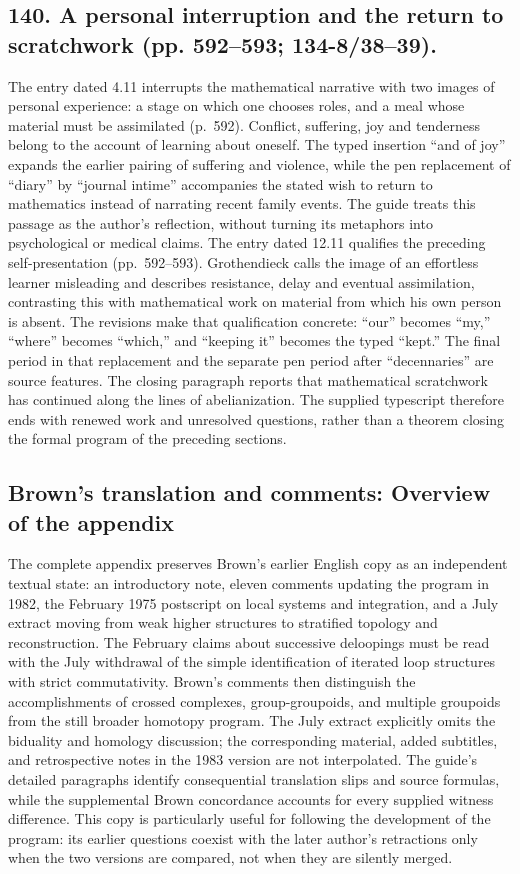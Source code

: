 \documentclass[10pt,oneside]{book}
\begin{document}
\subsection*{140. A personal interruption and the return to scratchwork (pp. 592--593; 134-8/38--39).}
The entry dated 4.11 interrupts the mathematical narrative with two images of personal experience: a stage on which one chooses roles, and a meal whose material must be assimilated (p.~592). Conflict, suffering, joy and tenderness belong to the account of learning about oneself. The typed insertion ``and of joy'' expands the earlier pairing of suffering and violence, while the pen replacement of ``diary'' by ``journal intime'' accompanies the stated wish to return to mathematics instead of narrating recent family events. The guide treats this passage as the author's reflection, without turning its metaphors into psychological or medical claims. The entry dated 12.11 qualifies the preceding self-presentation (pp.~592--593). Grothendieck calls the image of an effortless learner misleading and describes resistance, delay and eventual assimilation, contrasting this with mathematical work on material from which his own person is absent. The revisions make that qualification concrete: ``our'' becomes ``my,'' ``where'' becomes ``which,'' and ``keeping it'' becomes the typed ``kept.'' The final period in that replacement and the separate pen period after ``decennaries'' are source features. The closing paragraph reports that mathematical scratchwork has continued along the lines of abelianization. The supplied typescript therefore ends with renewed work and unresolved questions, rather than a theorem closing the formal program of the preceding sections.

\subsection*{Brown's translation and comments: Overview of the appendix}
The complete appendix preserves Brown's earlier English copy as an independent textual state: an introductory note, eleven comments updating the program in 1982, the February 1975 postscript on local systems and integration, and a July extract moving from weak higher structures to stratified topology and reconstruction. The February claims about successive deloopings must be read with the July withdrawal of the simple identification of iterated loop structures with strict commutativity. Brown's comments then distinguish the accomplishments of crossed complexes, group-groupoids, and multiple groupoids from the still broader homotopy program. The July extract explicitly omits the biduality and homology discussion; the corresponding material, added subtitles, and retrospective notes in the 1983 version are not interpolated. The guide's detailed paragraphs identify consequential translation slips and source formulas, while the supplemental Brown concordance accounts for every supplied witness difference. This copy is particularly useful for following the development of the program: its earlier questions coexist with the later author's retractions only when the two versions are compared, not when they are silently merged.
\end{document}
